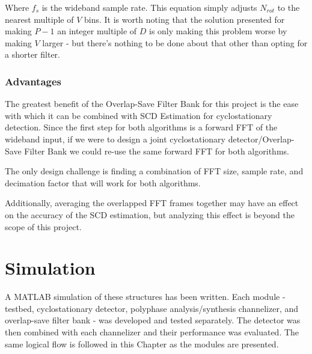 \documentclass[12pt]{report}
\begin{document}
Where $f_s$ is the wideband sample rate. This equation simply adjusts $N_{rot}$
to the nearest multiple of $V$ bins. It is worth noting that the solution
presented for making $P-1$ an integer multiple of $D$ is only making this
problem worse by making $V$ larger - but there's nothing to be done about that
other than opting for a shorter filter.

\subsection{Advantages}
\label{sec:os_advantages}

The greatest benefit of the Overlap-Save Filter Bank for this project is the
ease with which it can be combined with SCD Estimation for cyclostationary
detection. Since the first step for both algorithms is a forward FFT of the
wideband input, if we were to design a joint cyclostationary
detector/Overlap-Save Filter Bank we could re-use the same forward FFT for both
algorithms.

The only design challenge is finding a combination of FFT size, sample rate,
and decimation factor that will work for both algorithms.



Additionally, averaging the overlapped FFT frames together may have an effect
on the accuracy of the SCD estimation, but analyzing this effect is beyond the
scope of this project.

\chapter{Simulation}
\label{sec:sim}
A MATLAB simulation of these structures has been written. Each module
- testbed, cyclostationary detector, polyphase analysis/synthesis channelizer,
and overlap-save filter bank - was developed and tested separately. The
detector was then combined with each channelizer and their performance was
evaluated.  The same logical flow is followed in this Chapter as the modules
are presented.
\end{document}

